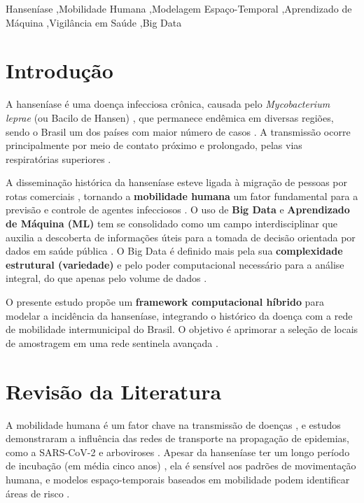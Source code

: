 \documentclass[preprint,12pt]{elsarticle}
\begin{document}
\begin{frontmatter}
\begin{keyword}
Hanseníase \sep Mobilidade Humana \sep Modelagem Espaço-Temporal \sep Aprendizado de Máquina \sep Vigilância em Saúde \sep Big Data \cite{inovacao2024modelagem}
\end{keyword}

\end{frontmatter}

\section{Introdução}

A hanseníase é uma doença infecciosa crônica, causada pelo \textit{Mycobacterium leprae} (ou Bacilo de Hansen) \cite{pcdt2022bacilo, guia2017guia}, que permanece endêmica em diversas regiões, sendo o Brasil um dos países com maior número de casos \cite{inovacao2024computacional, pcdt2022protocolo}. A transmissão ocorre principalmente por meio de contato próximo e prolongado, pelas vias respiratórias superiores \cite{inovacao2024modelagem, guia2017guia}.

A disseminação histórica da hanseníase esteve ligada à migração de pessoas por rotas comerciais \cite{inovacao2024modelagem}, tornando a \textbf{mobilidade humana} um fator fundamental para a previsão e controle de agentes infecciosos \cite{oliveira2024summary, lima2022temporal}. O uso de \textbf{Big Data} e \textbf{Aprendizado de Máquina (ML)} tem se consolidado como um campo interdisciplinar que auxilia a descoberta de informações úteis para a tomada de decisão orientada por dados em saúde pública \cite{saldanha2021ciencia, mooney2018big, goldstein2020convergence}. O Big Data é definido mais pela sua \textbf{complexidade estrutural (variedade)} e pelo poder computacional necessário para a análise integral, do que apenas pelo volume de dados \cite{saldanha2021ciencia, mooney2018big}.

O presente estudo propõe um \textbf{framework computacional híbrido} para modelar a incidência da hanseníase, integrando o histórico da doença com a rede de mobilidade intermunicipal do Brasil. O objetivo é aprimorar a seleção de locais de amostragem em uma rede sentinela avançada \cite{inovacao2024modelagem, oliveira2024summary}.

\section{Revisão da Literatura}

A mobilidade humana é um fator chave na transmissão de doenças \cite{oliveira2024summary, lima2022temporal}, e estudos demonstraram a influência das redes de transporte na propagação de epidemias, como a SARS-CoV-2 \cite{inovacao2024modelagem, silva2022machine} e arboviroses \cite{lima2022temporal}. Apesar da hanseníase ter um longo período de incubação (em média cinco anos) \cite{pcdt2022bacilo}, ela é sensível aos padrões de movimentação humana, e modelos espaço-temporais baseados em mobilidade podem identificar áreas de risco \cite{inovacao2024analise}.
\end{document}
